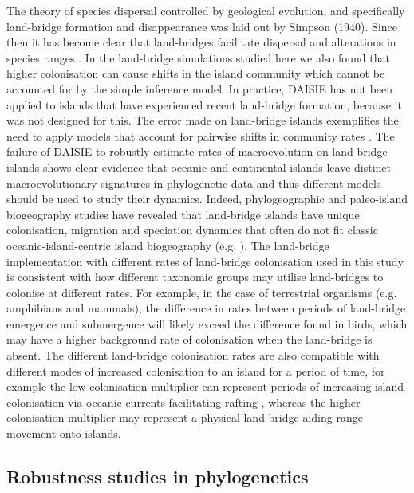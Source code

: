 \documentclass{article}
\begin{document}
The theory of species dispersal controlled by geological evolution, and specifically land-bridge formation and disappearance was laid out by Simpson (1940). Since then it has become clear that land-bridges facilitate dispersal and alterations in species ranges \citep{wilcox_supersaturated_1978}. In the land-bridge simulations studied here we also found that higher colonisation can cause shifts in the island community which cannot be accounted for by the simple inference model. In practice, DAISIE has not been applied to islands that have experienced recent land-bridge formation, because it was not designed for this. The error made on land-bridge islands exemplifies the need to apply models that account for pairwise shifts in community rates \cite{hauffe_lake_2020}. The failure of DAISIE to robustly estimate rates of macroevolution on land-bridge islands shows clear evidence that oceanic and continental islands leave distinct macroevolutionary signatures in phylogenetic data and thus different models should be used to study their dynamics. Indeed, phylogeographic and paleo-island biogeography studies have revealed that land-bridge islands have unique colonisation, migration and speciation dynamics that often do not fit classic oceanic-island-centric island biogeography (e.g. \citep{papadopoulou_genomic_2015, hammoud_past_2021}).  The land-bridge implementation with different rates of land-bridge colonisation used in this study is consistent with how different taxonomic groups may utilise land-bridges to colonise at different rates. For example, in the case of terrestrial organisms (e.g. amphibians and mammals), the difference in rates between periods of land-bridge emergence and submergence will likely exceed the difference found in birds, which may have a higher background rate of colonisation when the land-bridge is absent. The different land-bridge colonisation rates are also compatible with different modes of increased colonisation to an island for a period of time, for example the low colonisation multiplier can represent periods of increasing island colonisation via oceanic currents facilitating rafting \citep{ali_mammalian_2010}, whereas the higher colonisation multiplier may represent a physical land-bridge aiding range movement onto islands. 

\subsection*{Robustness studies in phylogenetics}
\end{document}
